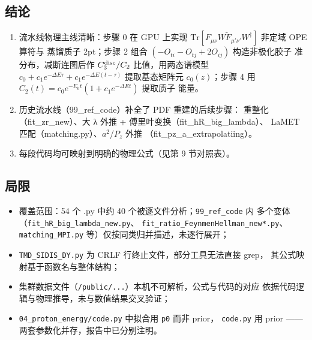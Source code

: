 \documentclass[UTF8]{ctexart}
\begin{document}
\subsection{结论}

\begin{enumerate}[itemsep=2pt]
  \item 流水线物理主线清晰：步骤 0 在 GPU 上实现
        $\mathrm{Tr}[F_{\mu\nu}W\tilde F_{\mu'\nu'}W^\dagger]$ 非定域 OPE 算符与
        蒸馏质子 2pt；步骤 2 组合 $(-O_{ti}-O_{tj}+2O_{ij})$ 构造非极化胶子
        准分布，减断连图后作 $C_3^{\rm disc}/C_2$ 比值，用两态谱模型
        $c_0+c_1e^{-\Delta E\tau}+c_1e^{-\Delta E(t-\tau)}$ 提取基态矩阵元
        $c_0(z)$；步骤 4 用 $C_2(t)=c_0e^{-E_0t}(1+c_1e^{-\Delta Et})$ 提取质子
        能量。
  \item 历史流水线（99\_ref\_code）补全了 PDF 重建的后续步骤：
        重整化（fit\_zr\_new）、大 λ 外推 + 傅里叶变换（fit\_hR\_big\_lambda）、
        LaMET 匹配（matching.py）、$a^2$/$P_z$ 外推
        （fit\_pz\_a\_extrapolatiing）。
  \item 每段代码均可映射到明确的物理公式（见第 9 节对照表）。
\end{enumerate}

\subsection{局限}

\begin{itemize}
  \item 覆盖范围：54 个 .py 中约 40 个被逐文件分析；\texttt{99\_ref\_code} 内
        多个变体（\texttt{fit\_hR\_big\_lambda\_new.py}、
        \texttt{fit\_ratio\_FeynmenHellman\_new*.py}、\texttt{matching\_MPI.py}
        等）仅按同类归并描述，未逐行展开；
  \item \texttt{TMD\_SIDIS\_DY.py} 为 CRLF 行终止文件，部分工具无法直接 grep，
        其公式映射基于函数名与整体结构；
  \item 集群数据文件（\texttt{/public/...}）本机不可解析，公式与代码的对应
        依据代码逻辑与物理推导，未与数值结果交叉验证；
  \item \texttt{04\_proton\_energy/code.py} 中拟合用 \texttt{p0} 而非 prior，
        \texttt{code.py} 用 prior —— 两套参数化并存，报告中已分别注明。
\end{itemize}
\end{document}
